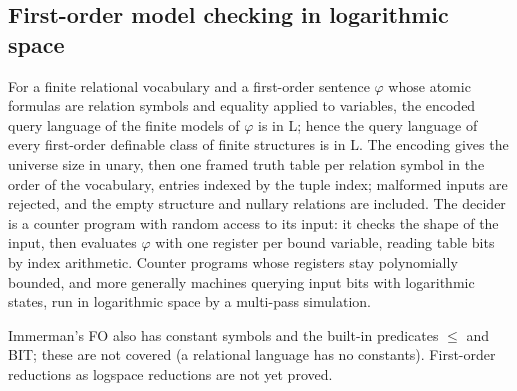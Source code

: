 \begin{result}
\subsection{First-order model checking in logarithmic space}
For a finite relational vocabulary and a first-order sentence $\varphi$ whose
atomic formulas are relation symbols and equality applied to variables, the
encoded query language of the finite models of $\varphi$ is in L; hence the
query language of every first-order definable class of finite structures is in
L. The encoding gives the universe size in unary, then one framed truth table
per relation symbol in the order of the vocabulary, entries indexed by the
tuple index; malformed inputs are rejected, and the empty structure and nullary
relations are included. The decider is a counter program with random access to
its input: it checks the shape of the input, then evaluates $\varphi$ with one
register per bound variable, reading table bits by index arithmetic. Counter
programs whose registers stay polynomially bounded, and more generally machines
querying input bits with logarithmic states, run in logarithmic space by a
multi-pass simulation.\citep[Theorem 3.1]{Immerman1999}

Immerman's FO also has constant symbols and the built-in predicates $\le$ and
BIT; these are not covered (a relational language has no constants). First-order
reductions as logspace reductions are not yet proved.
\end{result}
